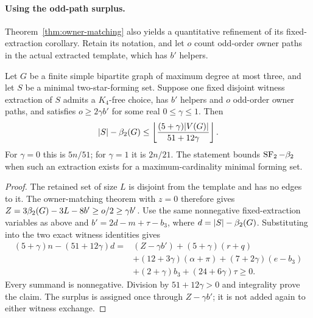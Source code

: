 \paragraph{Using the odd-path surplus.}
Theorem~\ref{thm:owner-matching} also yields a quantitative refinement of its
fixed-extraction corollary. Retain its notation, and let $o$ count odd-order
owner paths in the actual extracted template, which has $b'$ helpers.

\begin{corollary}\label{cor:odd-path-refinement}
Let $G$ be a finite simple bipartite graph of maximum degree at most three,
and let $S$ be a minimal two-star-forming set. Suppose one fixed disjoint
witness extraction of $S$ admits a $K_4$-free choice, has $b'$ helpers and
$o$ odd-order owner paths, and satisfies $o\ge2\gamma b'$ for some real
$0\le\gamma\le1$. Then
\[
 |S|-\beta_2(G)\le
 \left\lfloor\frac{(5+\gamma)|V(G)|}{51+12\gamma}\right\rfloor.
\]
For $\gamma=0$ this is $5n/51$; for $\gamma=1$ it is $2n/21$.
The statement bounds $\operatorname{SF}_2-\beta_2$ when such an extraction exists for a
maximum-cardinality minimal forming set.
\end{corollary}
\begin{proof}
The retained set of size $L$ is disjoint from the template and has no edges
to it. The owner-matching theorem with $z=0$ therefore gives
$Z=3\beta_2(G)-3L-8b'\ge o/2\ge\gamma b'$.
Use the same nonnegative fixed-extraction variables as above and
$b'=2d-m+\tau-b_3$, where $d=|S|-\beta_2(G)$. Substituting into the two exact
witness identities gives
\begin{align*}
 (5+\gamma)n-(51+12\gamma)d
 ={}&(Z-\gamma b')+(5+\gamma)(r+q)\\
 &+(12+3\gamma)(\alpha+\pi)+(7+2\gamma)(e-b_3)\\
 &+(2+\gamma)b_3+(24+6\gamma)\tau\ge0.
\end{align*}
Every summand is nonnegative. Division by $51+12\gamma>0$ and integrality
prove the claim. The surplus is assigned once through $Z-\gamma b'$;
it is not added again to either witness exchange.
\end{proof}
